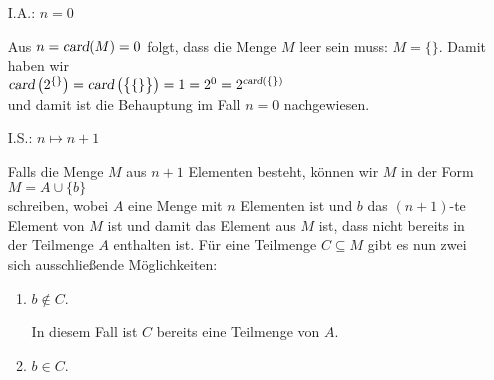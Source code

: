 \begin{enumerate}
\item[I.A.:] $n = 0$

     Aus $n = \textsl{card}(M) = 0$ folgt, dass die Menge $M$ leer sein muss: $M = \{\}$.
     Damit haben wir
     \\[0.2cm]
     \hspace*{1.3cm}
     $\textsl{card}\left(2^{\{\}}\right) = \textsl{card}\left(\bigl\{ \{\} \bigr\}\right)
       = 1 = 2^0 = 2^{\textsl{card}(\{\})}
     $
     \\[0.2cm]
     und damit ist die Behauptung im Fall $n = 0$ nachgewiesen.
\item[I.S.:] $n \mapsto n + 1$

     Falls die Menge $M$ aus $n+1$ Elementen besteht, können wir $M$ in der Form
     \\[0.2cm]
     \hspace*{1.3cm}
     $M = A \cup \{ b \}$
     \\[0.2cm]
     schreiben, wobei $A$ eine Menge mit $n$ Elementen ist und $b$ das $(n+1)$-te Element
     von $M$ ist und damit das Element aus $M$ ist, dass nicht bereits in der Teilmenge
     $A$ enthalten ist. 
     Für eine Teilmenge $C \subseteq M$ gibt es nun zwei sich ausschließende Möglichkeiten:  
     \begin{enumerate}
     \item $b \not\in C$.
       
           In diesem Fall ist $C$ bereits eine Teilmenge von $A$.
     \item $b \in C$.


\end{enumerate}
\end{enumerate}
